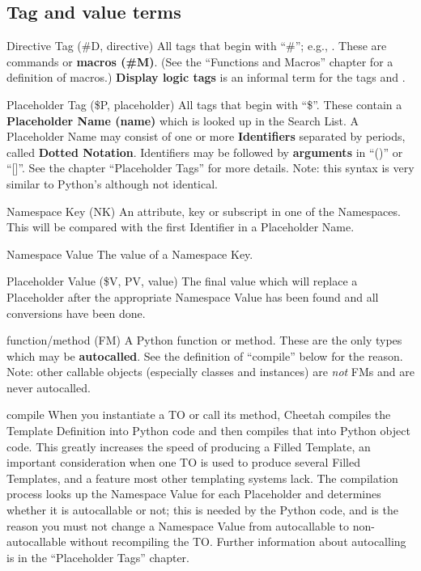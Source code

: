 \subsection{Tag and value terms}

\begin{description}

\item{Directive Tag (\#D, directive)}  All tags that begin with ``\#''; e.g.,
     .  These are commands or {\bf macros (\#M)}.  (See the
     ``Functions and Macros'' chapter for a definition of macros.)
     {\bf Display logic tags} is an informal term for the tags 
      and .

\item{Placeholder Tag (\$P, placeholder)}  All tags that begin with ``\$''.
     These contain a {\bf Placeholder Name (name)} which is looked up in the
     Search List.  A Placeholder Name may consist of one or more
     {\bf Identifiers} separated by periods, called {\bf Dotted Notation}.
     Identifiers may be followed by {\bf arguments} in ``()'' or ``[]''.  See
     the chapter ``Placeholder Tags'' for more details.  Note: this syntax is
     very similar to Python's although not identical.

\item{Namespace Key (NK)}  An attribute, key or subscript in one of the
     Namespaces.  This will be compared with the first Identifier in a
     Placeholder Name.

\item{Namespace Value}  The value of a Namespace Key.

\item{Placeholder Value (\$V, PV, value)}  The final value which will replace
     a Placeholder after the appropriate Namespace Value has been found and all
     conversions have been done.

\item{function/method (FM)}  A Python function or method.  These are the only
     types which may be {\bf autocalled}.  See the definition of ``compile''
     below for the reason.  Note: other callable objects
     (especially classes and instances) are {\em not} FMs and are never
     autocalled.

\item{compile}  When you instantiate a TO or call its 
     method, Cheetah compiles the Template Definition into Python code and then
     compiles that into Python object code.  This greatly increases the speed
     of producing a Filled Template, an important consideration when one TO
     is used to produce several Filled Templates, and a feature most other
     templating systems lack.  The compilation process looks up the Namespace
     Value for each Placeholder and determines whether it is autocallable or
     not; this is needed by the Python code, and is the reason you must not
     change a Namespace Value from autocallable to non-autocallable without
     recompiling the TO.  Further information about autocalling is in the
     ``Placeholder Tags'' chapter.


\end{description}


